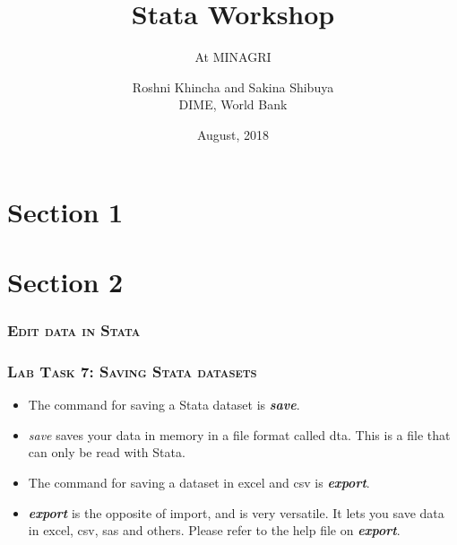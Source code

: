 \documentclass[10pt]{beamer}
\title{Stata Workshop} %
\subtitle{At MINAGRI} %
\author{Roshni Khincha and Sakina Shibuya \\ DIME, World Bank}
\date{August, 2018}
\begin{document}
		
	\maketitle

	\section{Section 1}
	\section{Section 2}

	\begin{frame}
	\frametitle{\textsc{Edit data in Stata}}
\begin{stlog}\end{stlog}
	\end{frame}
	
	\begin{frame}
	\frametitle{\textsc{Lab Task 7: Saving Stata datasets}}	
		\begin{itemize}
			\item The command for saving a Stata dataset is \textit{\textbf{save}}.
			\item \textit{save} saves your data in memory in a file format called dta. This is a file that can only be read with Stata.
			\item The command for saving a dataset in excel and csv is \textit{\textbf{export}}.
			\item \textit{\textbf{export}} is the opposite of import, and is very versatile. 
				  It lets you save data in excel, csv, sas and others. 
				  Please refer to the help file on \textit{\textbf{export}}.
		\end{itemize}	
	\end{frame}
\end{document}
